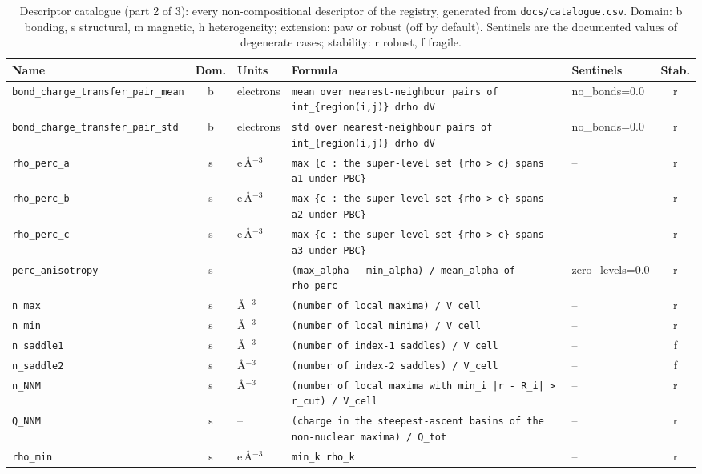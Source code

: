 \begin{table}[p]
\centering
\caption{Descriptor catalogue (part 2 of 3): every non-compositional descriptor of the registry, generated from \texttt{docs/catalogue.csv}. Domain: b bonding, s structural, m magnetic, h heterogeneity; extension: paw or robust (off by default). Sentinels are the documented values of degenerate cases; stability: r robust, f fragile.}
\scriptsize
\begin{tabular}{p{3.3cm}cp{1.4cm}p{6.6cm}p{2.3cm}c}
\toprule
Name & Dom. & Units & Formula & Sentinels & Stab. \\
\midrule
\texttt{bond\_charge\_transfer\_pair\_mean} & b & electrons & \texttt{mean over nearest-neighbour pairs of int\_\{region(i,j)\} drho dV} & no\_bonds=0.0 & r \\
\texttt{bond\_charge\_transfer\_pair\_std} & b & electrons & \texttt{std over nearest-neighbour pairs of int\_\{region(i,j)\} drho dV} & no\_bonds=0.0 & r \\
\texttt{rho\_perc\_a} & s & e\,\AA$^{-3}$ & \texttt{max \{c : the super-level set \{rho > c\} spans a1 under PBC\}} & -- & r \\
\texttt{rho\_perc\_b} & s & e\,\AA$^{-3}$ & \texttt{max \{c : the super-level set \{rho > c\} spans a2 under PBC\}} & -- & r \\
\texttt{rho\_perc\_c} & s & e\,\AA$^{-3}$ & \texttt{max \{c : the super-level set \{rho > c\} spans a3 under PBC\}} & -- & r \\
\texttt{perc\_anisotropy} & s & -- & \texttt{(max\_alpha - min\_alpha) / mean\_alpha of rho\_perc} & zero\_levels=0.0 & r \\
\texttt{n\_max} & s & \AA$^{-3}$ & \texttt{(number of local maxima) / V\_cell} & -- & r \\
\texttt{n\_min} & s & \AA$^{-3}$ & \texttt{(number of local minima) / V\_cell} & -- & r \\
\texttt{n\_saddle1} & s & \AA$^{-3}$ & \texttt{(number of index-1 saddles) / V\_cell} & -- & f \\
\texttt{n\_saddle2} & s & \AA$^{-3}$ & \texttt{(number of index-2 saddles) / V\_cell} & -- & f \\
\texttt{n\_NNM} & s & \AA$^{-3}$ & \texttt{(number of local maxima with min\_i |r - R\_i| > r\_cut) / V\_cell} & -- & r \\
\texttt{Q\_NNM} & s & -- & \texttt{(charge in the steepest-ascent basins of the non-nuclear maxima) / Q\_tot} & -- & r \\
\texttt{rho\_min} & s & e\,\AA$^{-3}$ & \texttt{min\_k rho\_k} & -- & r \\

\end{tabular}
\end{table}
